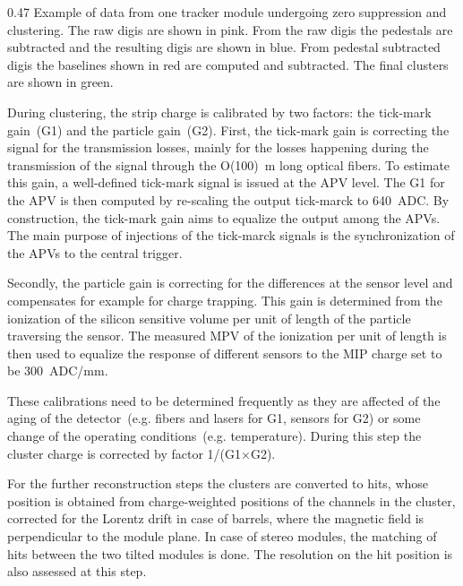                  {0.47}       %
                 {Example of data from one tracker module undergoing zero suppression and clustering. The raw digis are shown in pink. From the raw digis the pedestals are subtracted and the resulting digis are shown in blue. From pedestal subtracted digis the baselines shown in red are computed and subtracted. The final clusters are shown in green.} %


During clustering, the strip charge is calibrated by two factors: the tick-mark gain~(G1) and the particle gain~(G2). First, the tick-mark gain is correcting the signal for the transmission losses, mainly for the losses happening during the transmission of the signal through the O(100)~m long optical fibers. To estimate this gain, a well-defined tick-mark signal is issued at the APV level. The G1 for the APV is then computed by re-scaling the output tick-marck to 640~ADC. By construction, the tick-mark gain aims to equalize the output among the APVs. The main purpose of injections of the tick-marck signals is the synchronization of the APVs to the central trigger.

Secondly, the particle gain is correcting for the differences at the sensor level and compensates for example for charge trapping. This gain is determined from the ionization of the silicon sensitive volume per unit of length of the particle traversing the sensor. The measured MPV of the ionization per unit of length is then used to equalize the response of different sensors to the MIP charge set to be 300~ADC/mm. 

These calibrations need to be determined frequently as they are affected of the aging of the detector~(e.g. fibers and lasers for G1,  sensors for G2) or some change of the operating conditions~(e.g. temperature). During this step the cluster charge is corrected by factor 1/(G1$\times$G2).

For the further reconstruction steps the clusters are converted to hits, whose position is obtained from charge-weighted positions of the channels in the cluster, corrected for the Lorentz drift in case of barrels, where the magnetic field is perpendicular to the module plane. In case of stereo modules, the matching of hits between the two tilted modules is done. The resolution on the hit position is also assessed at this step.


